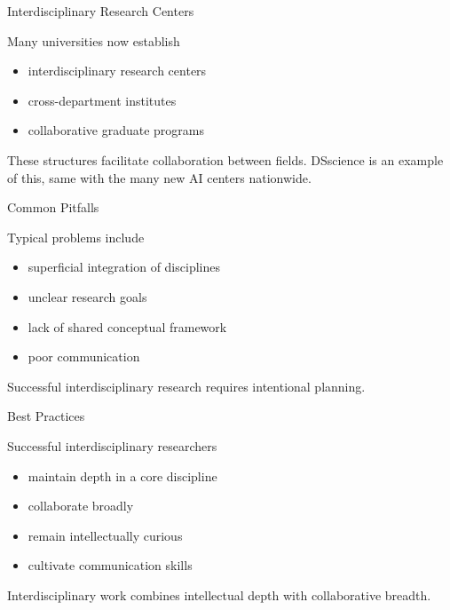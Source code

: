 \documentclass{beamer}
\begin{document}
\begin{frame}{Interdisciplinary Research Centers}

Many universities now establish

\begin{itemize}
\item interdisciplinary research centers
\item cross-department institutes
\item collaborative graduate programs
\end{itemize}

These structures facilitate collaboration
between fields. DSscience is an example of this, same with the many new AI centers nationwide.

\end{frame}


\begin{frame}{Common Pitfalls}

Typical problems include

\begin{itemize}
\item superficial integration of disciplines
\item unclear research goals
\item lack of shared conceptual framework
\item poor communication
\end{itemize}

Successful interdisciplinary research requires
intentional planning.

\end{frame}


\begin{frame}{Best Practices}

Successful interdisciplinary researchers

\begin{itemize}
\item maintain depth in a core discipline
\item collaborate broadly
\item remain intellectually curious
\item cultivate communication skills
\end{itemize}

Interdisciplinary work combines intellectual
depth with collaborative breadth.

\end{frame}
\end{document}
